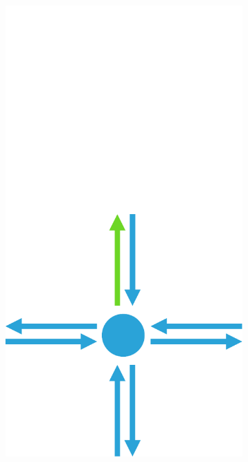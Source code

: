 \documentclass[12pt]{article}
\begin{document}
\begin{figure}[tb]
  \centering
  \vspace{-10 mm}

  \begin{subfigure}[b]{0.15\textwidth}
      \includegraphics[width=\textwidth]{img/1}
      \caption{}\label{fig:contraction_kernel_greedy1}
  \end{subfigure}

\end{figure}
\end{document}
